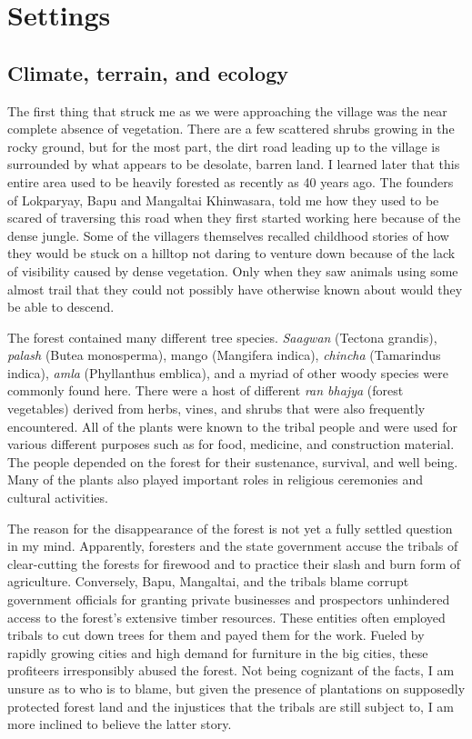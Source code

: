 \documentclass{report}
\begin{document}
\tableofcontents

\chapter{Settings}\label{ch:settings}
\section{Climate, terrain, and ecology}\label{sec:ecology}

The first thing that struck me as we were approaching the village was the near complete absence of vegetation. There are a few scattered shrubs growing in the rocky ground, but for the most part, the dirt road leading up to the village is surrounded by what appears to be desolate, barren land. I learned later that this entire area used to be heavily forested as recently as 40 years ago. The founders of Lokparyay, Bapu and Mangaltai Khinwasara, told me how they used to be scared of traversing this road when they first started working here because of the dense jungle. Some of the villagers themselves recalled childhood stories of how they would be stuck on a hilltop not daring to venture down because of the lack of visibility caused by dense vegetation. Only when they saw animals using some almost trail that they could not possibly have otherwise known about would they be able to descend.

The forest contained many different tree species. \textit{Saagwan} (Tectona grandis), \textit{palash} (Butea monosperma), mango (Mangifera indica), \textit{chincha} (Tamarin\-dus indica), \textit{amla} (Phyllanthus emblica), and a myriad of other woody species were commonly found here. There were a host of different \textit{ran bhajya} (forest vegetables) derived from herbs, vines, and shrubs that were also frequently encountered. All of the plants were known to the tribal people and were used for various different purposes such as for food, medicine, and construction material. The people depended on the forest for their sustenance, survival, and well being. Many of the plants also played important roles in religious ceremonies and cultural activities.

The reason for the disappearance of the forest is not yet a fully settled question in my mind. Apparently, foresters and the state government accuse the tribals of clear-cutting the forests for firewood and to practice their slash and burn form of agriculture. Conversely, Bapu, Mangaltai, and the tribals blame corrupt government officials for granting private businesses and prospectors unhindered access to the forest's extensive timber resources. These entities often employed tribals to cut down trees for them and payed them for the work. Fueled by rapidly growing cities and high demand for furniture in the big cities, these profiteers irresponsibly abused the forest. Not being cognizant of the facts, I am unsure as to who is to blame, but given the presence of plantations on supposedly protected forest land and the injustices that the tribals are still subject to, I am more inclined to believe the latter story.
\end{document}
